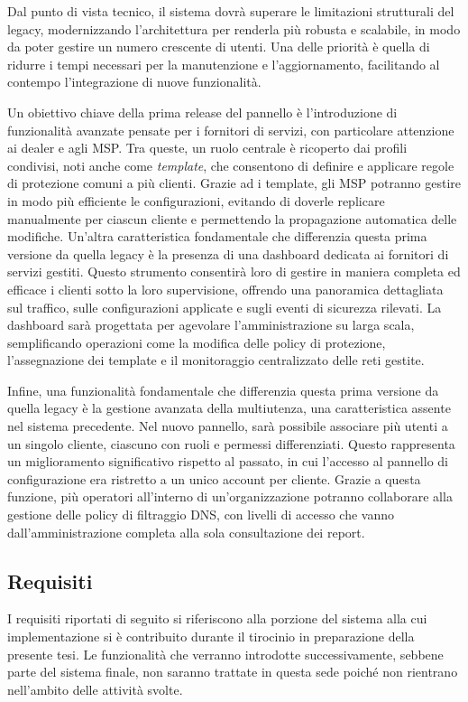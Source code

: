 Dal punto di vista tecnico, il sistema dovrà superare le limitazioni strutturali del legacy, modernizzando l'architettura per renderla più robusta e scalabile, in modo da poter gestire un numero crescente di utenti. Una delle priorità è quella di ridurre i tempi necessari per la manutenzione e l’aggiornamento, facilitando al contempo l’integrazione di nuove funzionalità.

Un obiettivo chiave della prima release del pannello è l'introduzione di funzionalità avanzate pensate per i fornitori di servizi, con particolare attenzione ai dealer e agli MSP. Tra queste, un ruolo centrale è ricoperto dai profili condivisi, noti anche come \textit{template}, che consentono di definire e applicare regole di protezione comuni a più clienti. Grazie ad i template, gli MSP potranno gestire in modo più efficiente le configurazioni, evitando di doverle replicare manualmente per ciascun cliente e permettendo la propagazione automatica delle modifiche.
%
Un'altra caratteristica fondamentale che differenzia questa prima versione da quella legacy è la presenza di una dashboard dedicata ai fornitori di servizi gestiti. Questo strumento consentirà loro di gestire in maniera completa ed efficace i clienti sotto la loro supervisione, offrendo una panoramica dettagliata sul traffico, sulle configurazioni applicate e sugli eventi di sicurezza rilevati. La dashboard sarà progettata per agevolare l’amministrazione su larga scala, semplificando operazioni come la modifica delle policy di protezione, l'assegnazione dei template e il monitoraggio centralizzato delle reti gestite.

Infine, una funzionalità fondamentale che differenzia questa prima versione da quella legacy è la gestione avanzata della multiutenza, una caratteristica assente nel sistema precedente. Nel nuovo pannello, sarà possibile associare più utenti a un singolo cliente, ciascuno con ruoli e permessi differenziati. Questo rappresenta un miglioramento significativo rispetto al passato, in cui l’accesso al pannello di configurazione era ristretto a un unico account per cliente. Grazie a questa funzione, più operatori all'interno di un'organizzazione potranno collaborare alla gestione delle policy di filtraggio DNS, con livelli di accesso che vanno dall'amministrazione completa alla sola consultazione dei report.

\subsection{Requisiti}
I requisiti riportati di seguito si riferiscono alla porzione del sistema alla cui implementazione si è contribuito durante il tirocinio in preparazione della presente tesi. Le funzionalità che verranno introdotte successivamente, sebbene parte del sistema finale, non saranno trattate in questa sede poiché non rientrano nell’ambito delle attività svolte.


